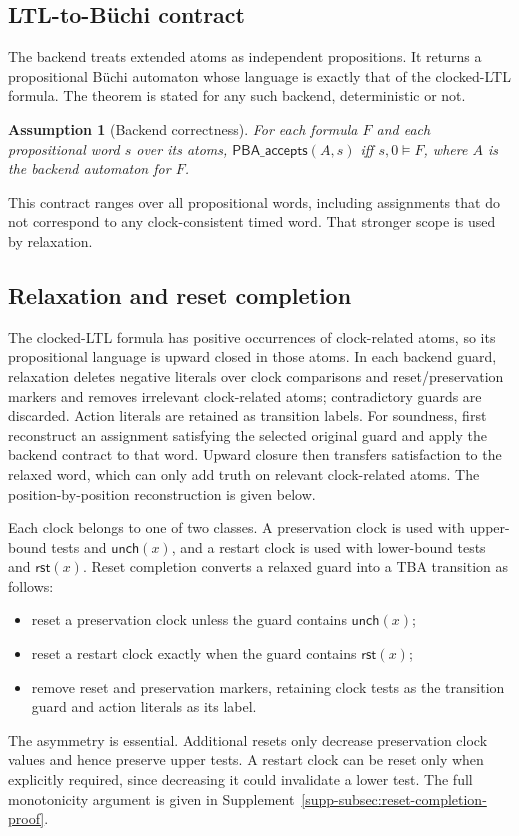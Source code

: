 \documentclass[10pt,journal,compsoc]{IEEEtran}
\newtheorem{assumption}[theorem]{Assumption}
\newcommand{\Reset}{\mathsf{rst}}
\newcommand{\Unch}{\mathsf{unch}}
\begin{document}
\subsection{LTL-to-B\"uchi contract}
The backend treats extended atoms as independent propositions. It returns a
propositional B\"uchi automaton whose language is exactly that of the
clocked-LTL formula. The theorem is stated for any such backend, deterministic
or not.
\begin{assumption}[Backend correctness]
\label{ass:backend}
For each formula $F$ and each propositional word $s$ over its atoms,
$\mathsf{PBA\_accepts}(A,s)$ iff $s,0\models F$, where $A$ is the backend
automaton for $F$.
\end{assumption}
This contract ranges over all propositional words, including assignments
that do not correspond to any clock-consistent timed word. That stronger
scope is used by relaxation.

\subsection{Relaxation and reset completion}
\label{sec:reset-completion}
The clocked-LTL formula has positive occurrences of clock-related atoms, so
its propositional language is upward closed in those atoms. In each backend
guard, relaxation deletes negative literals over clock comparisons and
reset/preservation markers and removes irrelevant clock-related atoms;
contradictory guards are discarded. Action literals are retained as transition
labels. For soundness, first reconstruct an assignment satisfying the
selected original guard and apply the backend contract to that word. Upward
closure then transfers satisfaction to the relaxed word, which can only add
truth on relevant clock-related atoms. The position-by-position
reconstruction is given below.

Each clock belongs to one of two classes. A preservation clock is used with
upper-bound tests and $\Unch(x)$, and a restart clock is used with
lower-bound tests and $\Reset(x)$. Reset completion converts a relaxed guard
into a TBA transition as follows:
\begin{itemize}
  \item reset a preservation clock unless the guard contains $\Unch(x)$;
  \item reset a restart clock exactly when the guard contains $\Reset(x)$;
  \item remove reset and preservation markers, retaining clock tests as the
        transition guard and action literals as its label.
\end{itemize}
The asymmetry is essential. Additional resets only decrease preservation
clock values and hence preserve upper tests. A restart clock can be reset
only when explicitly required, since decreasing it could invalidate a lower
test. The full monotonicity argument is given in
Supplement~\ref{supp-subsec:reset-completion-proof}.
\end{document}
